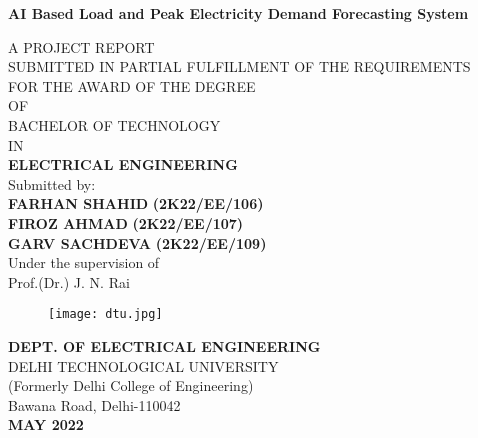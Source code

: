 \documentclass[12pt,a4paper]{report}
\begin{document}
\begin{center}
{\Large \textbf{AI Based Load and Peak Electricity Demand Forecasting System}}\\
\vspace{0.5cm}

A PROJECT REPORT\\
SUBMITTED IN PARTIAL FULFILLMENT OF THE REQUIREMENTS\\
FOR THE AWARD OF THE DEGREE\\
OF\\
BACHELOR OF TECHNOLOGY \\
IN\\
\textbf{ELECTRICAL ENGINEERING} \\
\vspace{1 cm}
Submitted by: \\

\textbf{FARHAN SHAHID}
\textbf{(2K22/EE/106)}\\

\textbf{FIROZ AHMAD}
\textbf{(2K22/EE/107)}\\

\textbf{GARV SACHDEVA}
\textbf{(2K22/EE/109)}\\
\vspace{0.2cm}
\vspace{1 cm}
Under the supervision of\\

Prof.(Dr.) J. N. Rai\\

\end{center}

\begin{center}
\begin{figure}[H]
    \centering
    \texttt{[image: dtu.jpg]}
    \label{fig:DTU logo}
\end{figure}
\textbf{DEPT. OF ELECTRICAL ENGINEERING}\\

DELHI TECHNOLOGICAL UNIVERSITY\\

(Formerly Delhi College of Engineering) \\
Bawana Road, Delhi-110042 \\
\textbf{MAY 2022}\\
\end{center}
\end{document}
